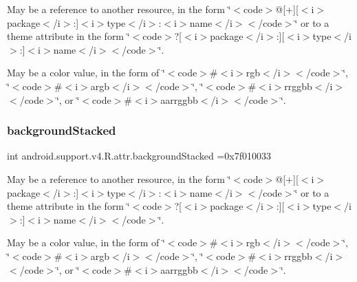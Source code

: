 May be a reference to another resource, in the form \char`\"{}$<$code$>$@\mbox{[}+\mbox{]}\mbox{[}$<$i$>$package$<$/i$>$\+:\mbox{]}$<$i$>$type$<$/i$>$\+:$<$i$>$name$<$/i$>$$<$/code$>$\char`\"{} or to a theme attribute in the form \char`\"{}$<$code$>$?\mbox{[}$<$i$>$package$<$/i$>$\+:\mbox{]}\mbox{[}$<$i$>$type$<$/i$>$\+:\mbox{]}$<$i$>$name$<$/i$>$$<$/code$>$\char`\"{}. 

May be a color value, in the form of \char`\"{}$<$code$>$\#$<$i$>$rgb$<$/i$>$$<$/code$>$\char`\"{}, \char`\"{}$<$code$>$\#$<$i$>$argb$<$/i$>$$<$/code$>$\char`\"{}, \char`\"{}$<$code$>$\#$<$i$>$rrggbb$<$/i$>$$<$/code$>$\char`\"{}, or \char`\"{}$<$code$>$\#$<$i$>$aarrggbb$<$/i$>$$<$/code$>$\char`\"{}. \mbox{\label{classandroid_1_1support_1_1v4_1_1R_1_1attr_af2fc746740dad6cfe275c2ff161399a6}} 
\subsubsection{\texorpdfstring{background\+Stacked}{backgroundStacked}}
{\footnotesize\ttfamily int android.\+support.\+v4.\+R.\+attr.\+background\+Stacked =0x7f010033\hspace{0.3cm}{\ttfamily [static]}}

May be a reference to another resource, in the form \char`\"{}$<$code$>$@\mbox{[}+\mbox{]}\mbox{[}$<$i$>$package$<$/i$>$\+:\mbox{]}$<$i$>$type$<$/i$>$\+:$<$i$>$name$<$/i$>$$<$/code$>$\char`\"{} or to a theme attribute in the form \char`\"{}$<$code$>$?\mbox{[}$<$i$>$package$<$/i$>$\+:\mbox{]}\mbox{[}$<$i$>$type$<$/i$>$\+:\mbox{]}$<$i$>$name$<$/i$>$$<$/code$>$\char`\"{}. 

May be a color value, in the form of \char`\"{}$<$code$>$\#$<$i$>$rgb$<$/i$>$$<$/code$>$\char`\"{}, \char`\"{}$<$code$>$\#$<$i$>$argb$<$/i$>$$<$/code$>$\char`\"{}, \char`\"{}$<$code$>$\#$<$i$>$rrggbb$<$/i$>$$<$/code$>$\char`\"{}, or \char`\"{}$<$code$>$\#$<$i$>$aarrggbb$<$/i$>$$<$/code$>$\char`\"{}. \mbox{\label{classandroid_1_1support_1_1v4_1_1R_1_1attr_aee5568276e5effa7f9682abb574dbb69}} 
